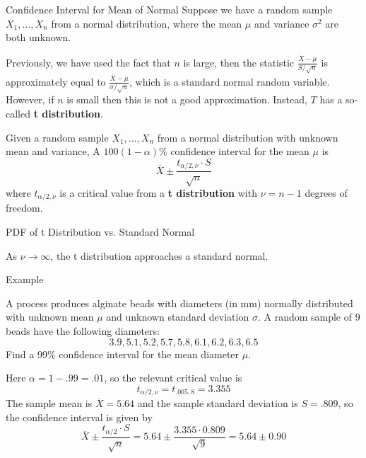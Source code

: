 \documentclass[handout]{beamer}
\renewcommand{\emph}{\textbf}
\begin{document}
\begin{frame}{Confidence Interval for Mean of Normal}
Suppose we have a random sample $X_1,\dots,X_n$ from a normal distribution, where the mean $\mu$ and variance $\sigma^2$ are both unknown. 

\pause \vspace{.2cm}Previously, we have used the fact that $n$ is large, then the statistic $\frac{\overline{X}-\mu}{S/\sqrt{n}}$ is approximately equal to $\frac{\overline{X}-\mu}{\sigma/\sqrt{n}}$, which is a standard normal random variable. However, if $n$ is small then this is not a good approximation. Instead, $T$ has a so-called \emph{t distribution}.

\pause \begin{block}{}
Given a random sample $X_1,\dots,X_n$ from a normal distribution with unknown mean and variance,
A $100(1-\alpha)\%$ confidence interval for the mean $\mu$ is
$$\overline{X} \pm \frac{t_{\alpha/2,\nu}\cdot S}{\sqrt{n}}$$
where $t_{\alpha/2,\nu}$ is a critical value from a \emph{t distribution} with $\nu=n-1$ degrees of freedom.
\end{block}
\end{frame}

\begin{frame}{PDF of t Distribution vs. Standard Normal}
\vspace{-1cm}

\vspace{-1cm}
As $\nu\to\infty$, the t distribution approaches a standard normal.
\end{frame}

\begin{frame}{Example}
\begin{block}{}
A process produces alginate beads
with diameters (in mm) normally distributed with unknown mean $\mu$ and unknown standard deviation $\sigma$. A random sample of 9 beads have the following diameters:
$$3.9, 5.1, 5.2, 5.7, 5.8, 6.1, 6.2, 6.3, 6.5$$
Find a 99\% confidence interval for the mean diameter $\mu$.
\end{block}
\pause Here $\alpha=1-.99=.01$, so the relevant critical value is 
$$t_{\alpha/2,\nu}=t_{.005,8} = 3.355$$
\pause The sample mean is $\overline X=5.64$ and the sample standard deviation is $S=.809$, so the confidence interval is given by
$$\overline X \pm \frac{t_{\alpha/2} \cdot S}{\sqrt n} = 5.64 \pm \frac{3.355 \cdot 0.809}{\sqrt{9}} = 5.64 \pm  0.90$$
\end{frame}
\end{document}
